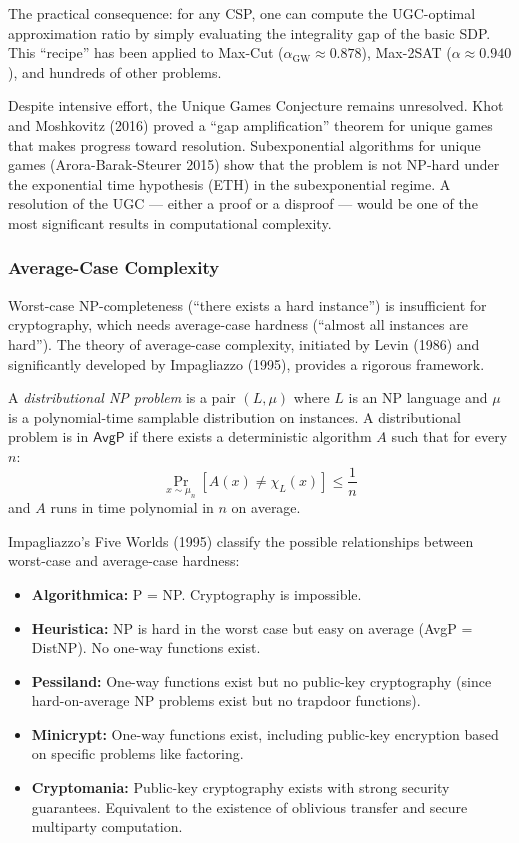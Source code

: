 The practical consequence: for any CSP, one can compute the UGC-optimal approximation ratio by simply evaluating the integrality gap of the basic SDP. This ``recipe'' has been applied to Max-Cut ($\alpha_{\text{GW}} \approx 0.878$), Max-2SAT ($\alpha \approx 0.940$), and hundreds of other problems.

Despite intensive effort, the Unique Games Conjecture remains unresolved. Khot and Moshkovitz (2016) proved a ``gap amplification'' theorem for unique games that makes progress toward resolution. Subexponential algorithms for unique games (Arora-Barak-Steurer 2015) show that the problem is not NP-hard under the exponential time hypothesis (ETH) in the subexponential regime. A resolution of the UGC — either a proof or a disproof — would be one of the most significant results in computational complexity.

\subsubsection*{Average-Case Complexity}
\label{sec:np:averagecase}

Worst-case NP-completeness (``there exists a hard instance'') is insufficient for cryptography, which needs average-case hardness (``almost all instances are hard''). The theory of average-case complexity, initiated by Levin (1986) and significantly developed by Impagliazzo (1995), provides a rigorous framework.

\begin{definition}
A \emph{distributional NP problem} is a pair $(L, \mu)$ where $L$ is an NP language and $\mu$ is a polynomial-time samplable distribution on instances. A distributional problem is in $\mathsf{AvgP}$ if there exists a deterministic algorithm $A$ such that for every $n$:
\[
\Pr_{x \sim \mu_n}[A(x) \neq \chi_L(x)] \le \frac{1}{n}
\]
and $A$ runs in time polynomial in $n$ on average.
\end{definition}

Impagliazzo's Five Worlds (1995) classify the possible relationships between worst-case and average-case hardness:
\begin{itemize}
\item \textbf{Algorithmica:} P = NP. Cryptography is impossible.
\item \textbf{Heuristica:} NP is hard in the worst case but easy on average (AvgP = DistNP). No one-way functions exist.
\item \textbf{Pessiland:} One-way functions exist but no public-key cryptography (since hard-on-average NP problems exist but no trapdoor functions).
\item \textbf{Minicrypt:} One-way functions exist, including public-key encryption based on specific problems like factoring.
\item \textbf{Cryptomania:} Public-key cryptography exists with strong security guarantees. Equivalent to the existence of oblivious transfer and secure multiparty computation.
\end{itemize}

